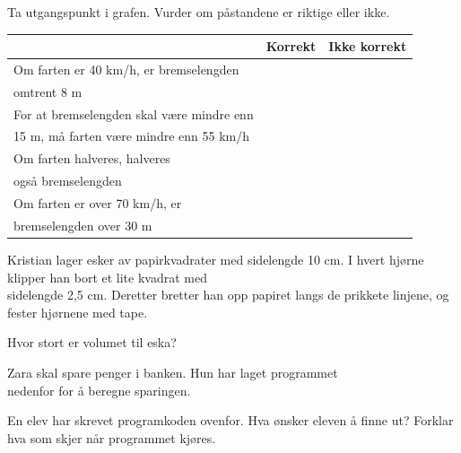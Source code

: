 \newpage
{}
Ta utgangspunkt i grafen. Vurder om påstandene er riktige eller ikke.
\begin{center}
	\small
\begin{tabular}{|l | c | c|}
	\hline
	& Korrekt & Ikke korrekt \\ \hline
	Om farten er 40 km/h, er bremselengden & & \\
	omtrent 8 m & &\\ \hline
	For at bremselengden skal være mindre enn  & & \\
	15 m, må farten være mindre enn 55 km/h & & \\ \hline
	Om farten halveres, halveres & & \\
	også bremselengden & &\\ \hline
	Om farten er over 70 km/h, er & & \\
	bremselengden  over 30 m  & & \\ \hline
\end{tabular}
\end{center}

\newpage
{}
Kristian lager esker av papirkvadrater med sidelengde 10 cm. \os
I hvert hjørne klipper han bort et lite kvadrat med\\ sidelengde 2,5 cm. \os
Deretter bretter han opp papiret langs de prikkete linjene, og\\ fester hjørnene med tape. \os

Hvor stort er volumet til eska?


\newpage
{}
Zara skal spare penger i banken. Hun har laget programmet \\ nedenfor for å beregne sparingen.

En elev har skrevet programkoden ovenfor.
Hva ønsker eleven å finne ut?
Forklar hva som skjer når programmet kjøres.
\newpage

